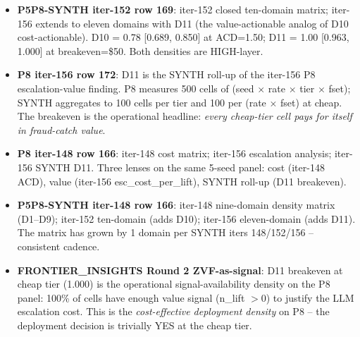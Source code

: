 \begin{itemize}
  \item \textbf{P5P8-SYNTH iter-152 row 169}: iter-152 closed
    ten-domain matrix; iter-156 extends to eleven domains with D11
    (the value-actionable analog of D10 cost-actionable).  D10 = 0.78
    [0.689, 0.850] at ACD=1.50; D11 = 1.00 [0.963, 1.000] at
    breakeven=\$50.  Both densities are HIGH-layer.
  \item \textbf{P8 iter-156 row 172}: D11 is the SYNTH roll-up of the
    iter-156 P8 escalation-value finding.  P8 measures 500 cells of
    (seed $\times$ rate $\times$ tier $\times$ fset); SYNTH aggregates
    to 100 cells per tier and 100 per (rate $\times$ fset) at cheap.
    The breakeven is the operational headline: \emph{every cheap-tier
    cell pays for itself in fraud-catch value}.
  \item \textbf{P8 iter-148 row 166}: iter-148 cost matrix; iter-156
    escalation analysis; iter-156 SYNTH D11.  Three lenses on the
    same 5-seed panel: cost (iter-148 ACD), value (iter-156
    esc\_cost\_per\_lift), SYNTH roll-up (D11 breakeven).
  \item \textbf{P5P8-SYNTH iter-148 row 166}: iter-148 nine-domain
    density matrix (D1--D9); iter-152 ten-domain (adds D10);
    iter-156 eleven-domain (adds D11).  The matrix has grown by 1
    domain per SYNTH iters 148/152/156 -- consistent cadence.
  \item \textbf{FRONTIER\_INSIGHTS Round 2 ZVF-as-signal}: D11
    breakeven at cheap tier (1.000) is the operational
    signal-availability density on the P8 panel: 100\% of cells have
    enough value signal (n\_lift $> 0$) to justify the LLM escalation
    cost.  This is the \emph{cost-effective deployment density} on
    P8 -- the deployment decision is trivially YES at the cheap
    tier.
\end{itemize}
